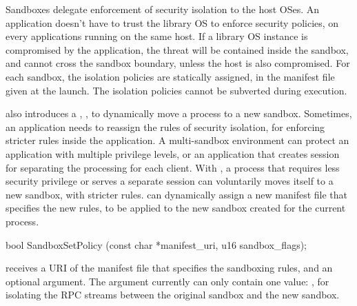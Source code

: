 Sandboxes delegate
enforcement of security isolation to the host OSes.
An application doesn't have to trust the library OS
to enforce security policies,
on every applications running on the same host.
If a library OS instance is compromised by the application,
the threat will be contained inside the sandbox,
and cannot cross the sandbox boundary, unless the host is also compromised.
For each sandbox,
the isolation policies are statically assigned,
in the manifest file given at the launch.
The isolation policies
cannot be subverted during execution.



\Thehostabi{} also introduces a \hostapi{}, ,
to dynamically move a process to a new sandbox.
Sometimes, an application needs to reassign the rules of security isolation,
for enforcing stricter rules inside the application.
A multi-sandbox environment can protect an application with multiple privilege levels, or an application that creates session for separating the processing for each client.
With , a process that requires less security privilege
or serves a separate session can voluntarily moves itself to a new sandbox,
with stricter rules.
 can dynamically
assign a new manifest file that specifies the new rules,
to be applied to the
new sandbox created for the current process.







\begin{paldef}
bool SandboxSetPolicy (const char *manifest_uri,
                       u16 sandbox_flags);
\end{paldef}


 receives a URI of the manifest file that specifies the sandboxing rules,
and an optional  argument.
The  argument currently can only contain one value:
, for isolating the RPC streams between the original sandbox and the new sandbox.
